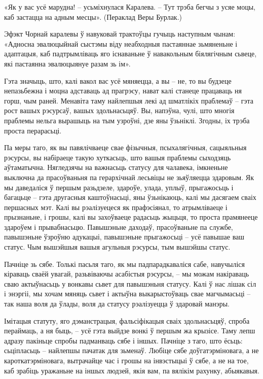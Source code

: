«Як у вас усё марудна! – усьміхнулася Каралева. – Тут трэба бегчы з усяе моцы, каб застацца на адным месцы». (Пераклад Веры Бурлак.)

Эфэкт Чорнай каралевы ў навуковай трактоўцы гучыць наступным чынам: «Адносна эвалюцыйнай сыстэмы віду неабходныя пастаяннае зьмяненьне і адаптацыя, каб падтрымліваць яго існаваньне ў навакольным біялягічным сьвеце, які пастаянна эвалюцыянуе разам зь ім».

Гэта значыць, што, калі вакол вас усё мяняецца, а вы – не, то вы будзеце непазьбежна і моцна адставаць ад прагрэсу, нават калі станеце працаваць ня горш, чым раней. Менавіта таму найлепшыя лекі ад шматлікіх праблемаў – гэта рост вашых рэсурсаў, вашых здольнасьцяў. Вы, напэўна, чулі, што многія праблемы нельга вырашыць на тым узроўні, дзе яны ўзьніклі. Згодны, іх трэба проста перарасьці. 

Па меры таго, як вы павялічваеце свае фізычныя, псыхалягічныя, сацыяльныя рэсурсы, вы набіраеце такую хуткасьць, што вашыя праблемы сыходзяць аўтаматычна. Нягледзячы на важнасьць статусу для чалавека, імкненьне выключна да прасоўваньня па герархічнай лесьвіцы не зьяўляецца здаровым. Як мы даведаліся ў першым разьдзеле, здароўе, улада, уплыў, прыгажосьць і багацьце – гэта другасныя каштоўнасьці, яны ўзьнікаюць, калі мы дасягаем сваіх першасных мэт. Калі вы рэалізуецеся як прафэсіянал, то атрымліваеце і прызнаньне, і грошы, калі вы захоўваеце радасьць жыцьця, то проста прамянееце здароўем і прывабнасьцю. Павышэньне даходаў, прасоўваньне па службе, павышэньне ўзроўню адукацыі, павышэньне прыгажосьці – усё павышае ваш статус. Чым вышэйшыя вашыя агульныя рэсурсы, тым вышэйшы статус.

Пачніце зь сябе. Толькі пасьля таго, як мы падпарадкаваліся сабе, навучыліся кіраваць сваёй увагай, разьвіваючы асабістыя рэсурсы, – мы можам накіраваць сваю актыўнасьць у вонкавы сьвет для павышэньня статусу. Калі ў нас лішак сіл і энэргіі, мы хочам мяняць сьвет і актыўна выкарыстоўваць свае магчымасьці – так наша воля да ўлады, воля да статусу рэалізуецца ў здаровай манэры.

Імітацыя статуту, яго дэманстрацыя, фальсіфікацыя сваіх здольнасьцяў, спроба пераймаць, а ня быць, – усё гэта выйдзе вонкі ў першым жа крызісе. Таму лепш адразу пакіньце спробы падманваць сябе і іншых. Пачніце з таго, што ёсьць: сьціпласьць – найлепшы пачатак для зьменаў. Любіце сябе доўгатэрміновага, а не кароткатэрміновага, вытрачайце час і грошы на інвэстыцыі ў сябе, а не на тое, каб зрабіць уражаньне на іншых людзей, якія вам, па вялікім рахунку, абыякавыя.

